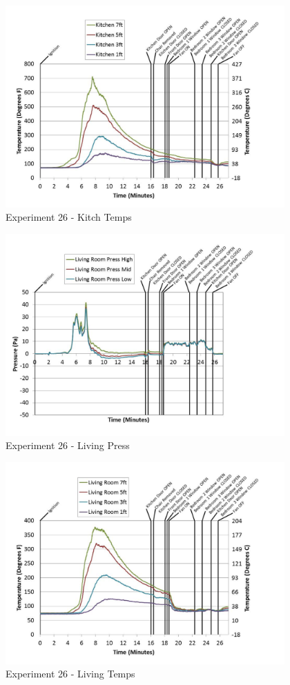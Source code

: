 \documentclass{article}
\begin{document}
\begin{appendices}
	\begin{figure}[h!]
		\centering
		\includegraphics[height=3.05in]{0_Images/Results_Charts/Exp_26_Charts/KitchTemps.pdf}
		\caption{Experiment 26 - Kitch Temps}
	\end{figure}
 
	\clearpage

	\begin{figure}[h!]
		\centering
		\includegraphics[height=3.05in]{0_Images/Results_Charts/Exp_26_Charts/LivingPress.pdf}
		\caption{Experiment 26 - Living Press}
	\end{figure}
 

	\begin{figure}[h!]
		\centering
		\includegraphics[height=3.05in]{0_Images/Results_Charts/Exp_26_Charts/LivingTemps.pdf}
		\caption{Experiment 26 - Living Temps}
	\end{figure}
 

\end{appendices}
\end{document}
